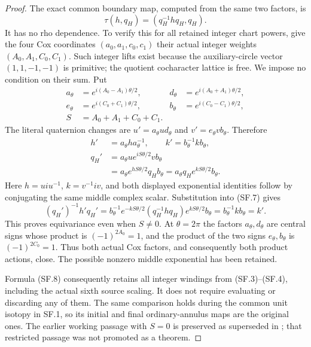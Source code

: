 \begin{proof}
The exact common boundary map, computed from the same two factors,
is
\[
               \tau(h,q_H)=(q_H^{-1}hq_H,q_H).             \tag{SF.7}
\]
It has no rho dependence. To verify this for all retained integer
chart powers, give the four Cox coordinates \((a_0,a_1,c_0,c_1)\)
their actual integer weights \((A_0,A_1,C_0,C_1)\). Such integer
lifts exist because the auxiliary-circle vector \((1,1,-1,-1)\)
is primitive; the quotient cocharacter lattice is free. We impose
no condition on their sum. Put
\[
 \begin{split}
 a_\theta&=e^{i(A_0-A_1)\theta/2},&
 d_\theta&=e^{i(A_0+A_1)\theta/2},\\
 e_\theta&=e^{i(C_0+C_1)\theta/2},&
 b_\theta&=e^{i(C_0-C_1)\theta/2},\\
 S&=A_0+A_1+C_0+C_1.
 \end{split}
\]
The literal quaternion changes are
\(u'=a_\theta u d_\theta\) and
\(v'=e_\theta v b_\theta\). Therefore
\[
 \begin{split}
 h'&=a_\theta h a_\theta^{-1},\qquad
 k'=b_\theta^{-1}k b_\theta,\\
 q_H'&=a_\theta u e^{iS\theta/2}v b_\theta\\
     &=a_\theta e^{hS\theta/2}q_H b_\theta
       =a_\theta q_H e^{kS\theta/2}b_\theta .
 \end{split}                                             \tag{SF.8}
\]
Here \(h=u i u^{-1}\), \(k=v^{-1}iv\), and both displayed
exponential identities follow by conjugating the same middle
complex scalar. Substitution into (SF.7) gives
\[
 (q_H')^{-1}h'q_H'
 =b_\theta^{-1}e^{-kS\theta/2}
              (q_H^{-1}h q_H)e^{kS\theta/2}b_\theta
 =b_\theta^{-1}k b_\theta=k'.
\]
This proves equivariance even when \(S\ne0\). At \(\theta=2\pi\)
the factors \(a_\theta,d_\theta\) are central signs whose product
is \((-1)^{2A_0}=1\), and the product of the two signs
\(e_\theta,b_\theta\) is \((-1)^{2C_0}=1\). Thus both actual Cox
factors, and consequently both product actions, close. The possible
nonzero middle exponential has been retained.

Formula (SF.8) consequently retains all integer windings from
(SF.3)--(SF.4), including the actual sixth source scaling. It does not
require evaluating or discarding any of them. The same comparison
holds during the common unit isotopy in SF.1, so its initial and
final ordinary-annulus maps are the original ones. The earlier
working passage with \(S=0\) is preserved as superseded in
;
that restricted passage was not promoted as a theorem.


\end{proof}
